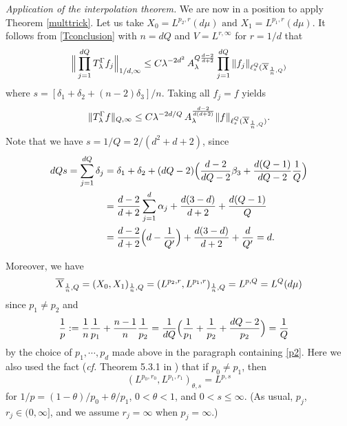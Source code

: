 \documentclass[11 pt]{amsart}
\theoremstyle{plain}
\numberwithin{equation}{section}
\theoremstyle{plain}
\numberwithin{equation}{section}
\theoremstyle{remark}
\begin{document}
\medskip

{\sl Application of the interpolation theorem.}
We are now in a position to apply Theorem \ref{multtrick}.
Let us take $X_0 = L^{p_2,r}(d\mu )\text{  and  } X_1 = L^{p_1,r}(d\mu )$.
It follows from \eqref{Tconclusion} with $n = d Q$ and $V = L^{r, \infty}$
for $r=1/d$ that
\begin{align*}\label{}
\Big\| \prod_{j=1}^{dQ} T_{\lambda}^{\Gamma} f_j \Big\|_{1/d ,\infty}
\le C {\lambda}^{-2 d^2} \, A_{\lambda}^{Q\frac{d-2}{d+2}} \prod_{j=1}^{dQ} \| f_j
\|_{\ell^{Q}_s (\overline{X}_{{1\over n}, Q})}
\end{align*}
where $ s= [\delta_1 + \delta_2 + (n -2)\delta_3 ]/n$. Taking
all $f_j=f$ yields
\begin{equation}\label{ellq}
\| T_{\lambda}^{\Gamma} f\|_{Q,\infty} \le C {\lambda}^{-2d/Q}\,A_{\lambda}^{\frac{d-2}{d(d+2)}}
\| f\|_{\ell^{Q}_s (\overline{X}_{{1\over n}, Q})} .
\end{equation}
Note that we have $s=1/Q =2/(d^2 + d +2)$, since
\begin{align*}
dQ s = \sum_{j=1}^{dQ} \delta_j &=\delta_1+\delta_2+ (dQ-2) \Big(
{d-2 \over dQ-2} \beta_3 +
{d(Q-1)\over dQ-2}{1\over Q}\Big)\\
&= {d-2 \over d+2}\sum_{j=1}^d \alpha_j + { d(3-d) \over d+2} + {d(Q-1)\over Q}\\
&= {d-2 \over d+2} \Big( d - {1\over Q'} \Big) + {d(3-d) \over d+2} + {d \over Q' } = d .
\end{align*}

Moreover, we have
\begin{align*}
\overline{X}_{{1\over n}, Q} = (X_0, X_1)_{{1\over n},Q} = (L^{p_2,r},
L^{p_1,r})_{{1\over n}, Q} = L^{p,Q} = L^Q ( d\mu )
\end{align*}
since $p_1 \not= p_2$ and
\begin{align*}
 {1\over p} &:= {1\over n} {1\over p_1} +  {n - 1\over
n} {1\over p_2} = {1\over dQ} \Big({1\over p_1} + {1\over p_2} + {dQ -2 \over
 p_2}\Big)
 
 
 = {1\over Q}
 
\end{align*}
by the choice of $p_1, \cdots, p_d$ made above in the paragraph containing \eqref{p2}. Here we also used the fact ({\it cf.} Theorem 5.3.1 in \cite{BeL}) that if $p_0\not=p_1$, then
$$(L^{p_0, r_0}, L^{p_1, r_1})_{\theta, s} = L^{p, s}$$
for $1/p=(1-\theta)/p_0 + \theta/p_1$, $0<\theta <1$, and $0< s\le
\infty$. (As usual, $p_j$, $r_j \in (0, \infty]$, and we assume
$r_j=\infty$ when $p_j=\infty$.)
\end{document}
